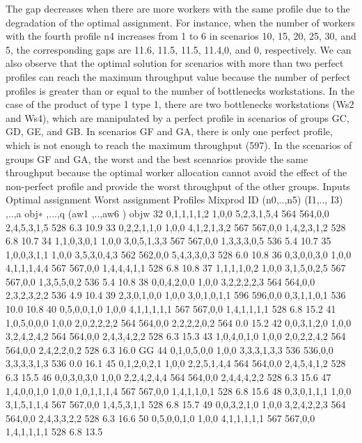 The gap decreases when there are more workers with the same profile due to the degradation of the optimal assignment. For instance, when the number of workers with the fourth profile n4 increases from 1 to 6 in scenarios 10, 15, 20, 25, 30, and 5, the corresponding gaps are 11.6, 11.5, 11.5, 11.4,0, and 0, respectively. We can also observe that the optimal solution for scenarios with more than two perfect profiles can reach the maximum throughput value because the number of perfect profiles is greater than or equal to the number of bottlenecks workstations. In the case of the product of type 1 type 1, there are two bottlenecks workstations (Ws2 and Ws4), which are manipulated by a perfect profile in scenarios of groups GC, GD, GE, and GB. In scenarios GF and GA, there is only one perfect profile, which is not enough to reach the maximum throughput (597). In the scenarios of groups GF and GA, the worst and the best scenarios provide the same throughput because the optimal worker allocation cannot avoid the effect of the non-perfect profile and provide the worst throughput of the other groups.
		Inputs	Optimal assignment	Worst assignment		
		Profiles	Mixprod				
	ID	(n0,..,n5)	(I1,.., I3)	 ,..,a 	obj∗	 ,...,q 	(aw1 ,..,aw6 )	objw	%
	32	0,1,1,1,1,2	1,0,0	5,2,3,1,5,4	564	564,0,0	2,4,5,3,1,5	528	6.3	10.9
	33	0,2,2,1,1,0	1,0,0	4,1,2,1,3,2	567	567,0,0	1,4,2,3,1,2	528	6.8	10.7
	34	1,1,0,3,0,1	1,0,0	3,0,5,1,3,3	567	567,0,0	1,3,3,3,0,5	536	5.4	10.7
	35	1,0,0,3,1,1	1,0,0	3,5,3,0,4,3	562	562,0,0	5,4,3,3,0,3	528	6.0	10.8
	36	0,3,0,0,3,0	1,0,0	4,1,1,1,4,4	567	567,0,0	1,4,4,4,1,1	528	6.8	10.8
	37	1,1,1,1,0,2	1,0,0	3,1,5,0,2,5	567	567,0,0	1,3,5,5,0,2	536	5.4	10.8
	38	0,0,4,2,0,0	1,0,0	3,2,2,2,2,3	564	564,0,0	2,3,2,3,2,2	536	4.9	10.4
	39	2,3,0,1,0,0	1,0,0	3,0,1,0,1,1	596	596,0,0	0,3,1,1,0,1	536	10.0	10.8
	40	0,5,0,0,1,0	1,0,0	4,1,1,1,1,1	567	567,0,0	1,4,1,1,1,1	528	6.8	15.2
	41	1,0,5,0,0,0	1,0,0	2,0,2,2,2,2	564	564,0,0	2,2,2,2,0,2	564	0.0	15.2
	42	0,0,3,1,2,0	1,0,0	3,2,4,2,4,2	564	564,0,0	2,4,3,4,2,2	528	6.3	15.3
	43	1,0,4,0,1,0	1,0,0	2,0,2,2,4,2	564	564,0,0	2,4,2,2,0,2	528	6.3	16.0
GG	44	0,1,0,5,0,0	1,0,0	3,3,3,1,3,3	536	536,0,0	3,3,3,3,1,3	536	0.0	16.1
	45	0,1,2,0,2,1	1,0,0	2,2,5,1,4,4	564	564,0,0	2,4,5,4,1,2	528	6.3	15.5
	46	0,0,3,0,3,0	1,0,0	2,2,4,2,4,4	564	564,0,0	2,4,4,4,2,2	528	6.3	15.6
	47	1,4,0,0,1,0	1,0,0	1,0,1,1,1,4	567	567,0,0	1,4,1,1,0,1	528	6.8	15.6
	48	0,3,0,1,1,1	1,0,0	3,1,5,1,1,4	567	567,0,0	1,4,5,3,1,1	528	6.8	15.7
	49	0,0,3,2,1,0	1,0,0	3,2,4,2,2,3	564	564,0,0	2,4,3,3,2,2	528	6.3	16.6
	50	0,5,0,0,1,0	1,0,0	4,1,1,1,1,1	567	567,0,0	1,4,1,1,1,1	528	6.8	13.5

